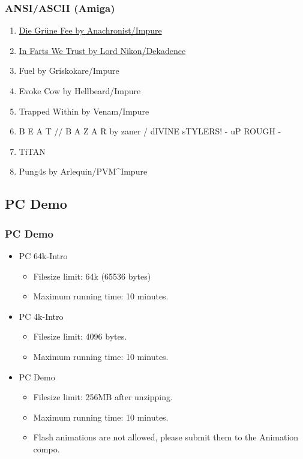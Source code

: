 \documentclass{beamer}
\begin{document}
\begin{frame}
  \frametitle{ANSI/ASCII (Amiga)}
  \begin{enumerate}
  \item \href{https://demozoo.org/graphics/191868/}{Die Grüne Fee by Anachronist/Impure}
  \item \href{https://demozoo.org/graphics/191873/}{In Farts We Trust by Lord Nikon/Dekadence}
  \item Fuel by Griskokare/Impure
  \item Evoke Cow by Hellbeard/Impure
  \item Trapped Within by Venam/Impure
  \item B E A T // B A Z A R by zaner / dIVINE sTYLERS! - uP ROUGH -
  \item TiTAN
  \item Pung4s by Arlequin/PVM\^{}Impure
  \end{enumerate}
\end{frame}


\subsection{PC Demo}
\begin{frame}
  \frametitle{PC Demo}
  \begin{itemize}
  \item PC 64k-Intro
    \begin{itemize}
    \item Filesize limit: 64k (65536 bytes)
    \item Maximum running time: 10 minutes.
    \end{itemize}
  \item PC 4k-Intro
    \begin{itemize}
    \item Filesize limit: 4096 bytes.
    \item Maximum running time: 10 minutes.
    \end{itemize}
  \item PC Demo
    \begin{itemize}
    \item Filesize limit: 256MB after unzipping.
    \item Maximum running time: 10 minutes.
    \item Flash animations are not allowed, please submit them to the Animation compo.
    \end{itemize}
  \end{itemize}
\end{frame}
\end{document}
